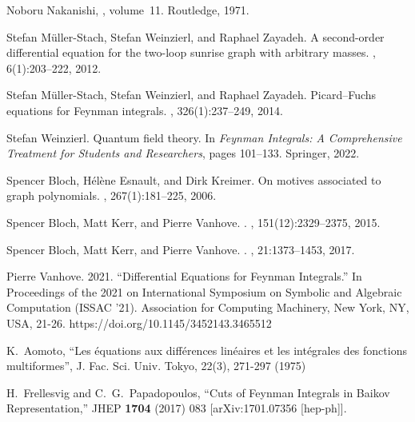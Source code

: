 \documentclass[a4paper,12pt]{article}
\numberwithin{equation}{section}
\numberwithin{figure}{section}
\begin{document}
\begin{thebibliography}{99}
Noboru Nakanishi,
, volume~11.
\newblock Routledge, 1971.


Stefan M{\"u}ller-Stach, Stefan Weinzierl, and Raphael Zayadeh.
\newblock A second-order differential equation for the two-loop sunrise graph
  with arbitrary masses.
, 6(1):203--222,
2012.
\newblock [arXiv:1112.4360]

Stefan M{\"u}ller-Stach, Stefan Weinzierl, and Raphael Zayadeh.
\newblock Picard--{F}uchs equations for {F}eynman integrals.
,
326(1):237--249, 2014.
\newblock [arXiv:1212.4389]

Stefan Weinzierl.
\newblock Quantum field theory.
\newblock In {\em Feynman Integrals: A Comprehensive Treatment for Students and
  Researchers}, pages 101--133. Springer, 2022.
\newblock [arXiv:2201.03593] 


Spencer Bloch, H{\'e}l{\`e}ne Esnault, and Dirk Kreimer.
\newblock On motives associated to graph polynomials.
,
267(1):181--225, 2006.

Spencer Bloch, Matt Kerr, and Pierre Vanhove.
.
, 151(12):2329--2375, 2015.
\newblock [arXiv:1406.2664] 

Spencer Bloch, Matt Kerr, and Pierre Vanhove.
.
, 21:1373--1453, 2017.
\newblock [arXiv:1601.08181]
  
  Pierre Vanhove. 2021. ``Differential Equations for Feynman Integrals.'' In Proceedings of the 2021 on International Symposium on Symbolic and Algebraic Computation (ISSAC '21). Association for Computing Machinery, New York, NY, USA, 21-26. https://doi.org/10.1145/3452143.3465512

    K.~Aomoto, ``Les \'equations aux diff\'erences
     lin\'eaires et les int\'egrales des fonctions multiformes'',
     J. Fac. Sci. Univ. Tokyo, 22(3), 271-297  (1975)
  
  H.~Frellesvig and C.~G.~Papadopoulos,
  ``Cuts of Feynman Integrals in Baikov Representation,''
  JHEP {\bf 1704} (2017) 083
  [arXiv:1701.07356 [hep-ph]].


\end{thebibliography}
\end{document}
